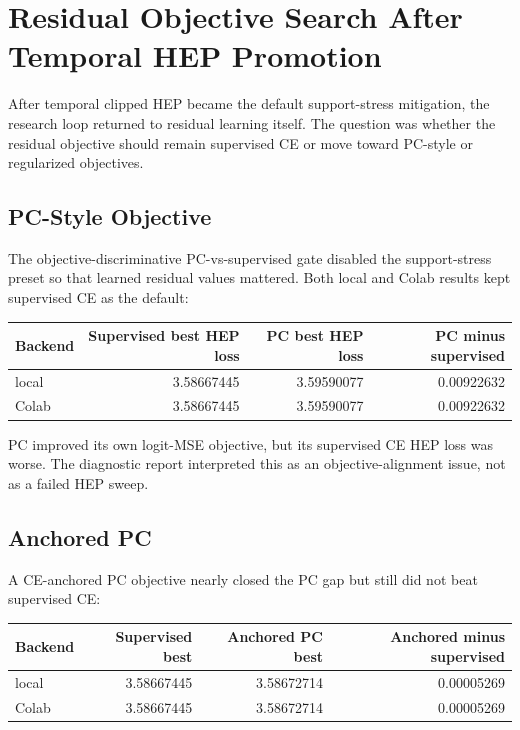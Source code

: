 \documentclass[11pt]{article}
\begin{document}
\section{Residual Objective Search After Temporal HEP Promotion}

After temporal clipped HEP became the default support-stress mitigation, the
research loop returned to residual learning itself. The question was whether
the residual objective should remain supervised CE or move toward PC-style or
regularized objectives.

\subsection{PC-Style Objective}

The objective-discriminative PC-vs-supervised gate disabled the support-stress
preset so that learned residual values mattered. Both local and Colab results
kept supervised CE as the default:

\begin{center}
\begin{tabular}{l r r r}
\hline
Backend & Supervised best HEP loss & PC best HEP loss & PC minus supervised \\
\hline
local & 3.58667445 & 3.59590077 & 0.00922632 \\
Colab & 3.58667445 & 3.59590077 & 0.00922632 \\
\hline
\end{tabular}
\end{center}

PC improved its own logit-MSE objective, but its supervised CE HEP loss was
worse. The diagnostic report interpreted this as an objective-alignment issue,
not as a failed HEP sweep.

\subsection{Anchored PC}

A CE-anchored PC objective nearly closed the PC gap but still did not beat
supervised CE:

\begin{center}
\begin{tabular}{l r r r}
\hline
Backend & Supervised best & Anchored PC best & Anchored minus supervised \\
\hline
local & 3.58667445 & 3.58672714 & 0.00005269 \\
Colab & 3.58667445 & 3.58672714 & 0.00005269 \\
\hline
\end{tabular}
\end{center}
\end{document}
